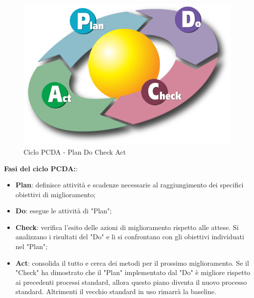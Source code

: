     \begin{figure}[h]
        \centering
        \includegraphics[scale=0.2]{sezioni/Immagini/PDCA.png}
        \caption{Ciclo PCDA - Plan Do Check Act}
    \end{figure}

    \textbf{Fasi del ciclo PCDA:}:
    \begin{itemize}
        \item \textbf{Plan}: definisce attività e scadenze necessarie al raggiungimento dei specifici obiettivi di miglioramento;
        \item \textbf{Do}: esegue le attività di "Plan";
        \item \textbf{Check}: verifica l'esito delle azioni di miglioramento rispetto alle attese. Si analizzano i risultati del "Do" e li si confrontano con gli obiettivi individuati nel "Plan";
        \item \textbf{Act}: consolida il tutto e cerca dei metodi per il prossimo miglioramento. Se il "Check" ha dimostrato che il "Plan" implementato dal "Do" è migliore rispetto ai precedenti processi standard, allora questo piano diventa il nuovo processo standard. Altrimenti il vecchio standard in uso rimarrà la baseline.
    \end{itemize}
